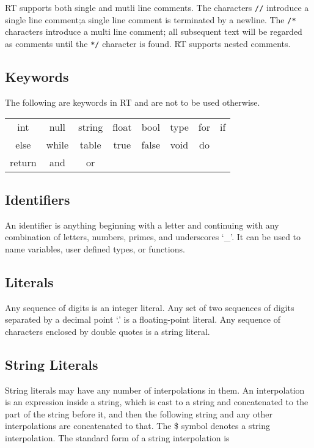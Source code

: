 RT supports both single and mutli line comments. The characters \texttt{//} introduce a 
single line comment;a single line comment is terminated by a newline. The \texttt{/*} characters 
introduce a multi line comment; all subsequent text will be regarded as comments until the \texttt{*/} 
character is found.  RT supports nested comments.

\subsection{Keywords}
The following are keywords in RT and are not to be used otherwise.
\begin{table}[here]
\centering
\begin{tabular} {c c c c c c c c}
int & null & string & float & bool & type & for & if \\ 
else & while & table & true & false & void & do \\
return & and & or
\end{tabular}
\end{table}

\subsection{Identifiers}

An identifier is anything beginning with a letter and continuing with any 
combination of letters, numbers, primes, and underscores `\_'.  It can be used to 
name variables, user defined types, or functions.

\subsection{Literals}

Any sequence of digits is an integer literal.  Any set of two sequences of digits 
separated by a decimal point `.' is a floating-point literal.  Any sequence of 
characters enclosed by double quotes is a string literal.

\subsection{String Literals}

String literals may have any number of interpolations in them.  An interpolation is an expression
inside a string, which is cast to a string and concatenated to the part of the string before it,
and then the following string and any other interpolations are concatenated to that.  The \$ symbol
denotes a string interpolation.  The standard form of a string interpolation is 

